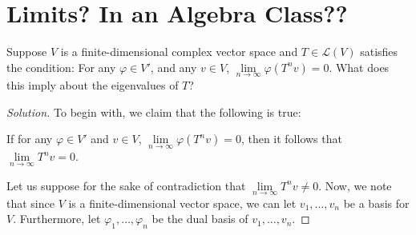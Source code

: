 \documentclass{article}
\newenvironment{solution}{\begin{proof}[Solution]}{\end{proof}}
\renewcommand\qedsymbol{$\blacksquare$}
\newenvironment{innerproof}{\renewcommand{\qedsymbol}{$\square$}\proof}{\endproof}
\begin{document}
	\section{Limits? In an Algebra Class??}
	\begin{hw}
		Suppose $V$ is a finite-dimensional complex vector space and $T \in \mathcal L(V)$ satisfies the condition: For any $\varphi \in V'$, and any $v \in V$, $\lim\limits_{n \rightarrow \infty} \varphi(T^{n}v) = 0$. What does this imply about the eigenvalues of $T$? 
	\end{hw}
	\begin{solution}
		\begin{comment}
			We observe that since, for any $\varphi \in V'$ and $v \in V$, we have $\lim\limits_{n \rightarrow \infty} \varphi(T^{n} v) = 0$, this means that even when $\varphi \neq 0$, it still maps $T^{n}v$ to $0$, for all $v \in V$.
		
		Then, it must be that for $\lim\limits_{n\rightarrow\infty} \varphi(T^{n}v) = 0$, we must have
		\begin{equation*}
			\lim\limits_{n \rightarrow\infty} T^{n}v = 0,
		\end{equation*}
		as $\varphi(0) = 0$ for all $\varphi$.
		\end{comment}
		To begin with, we claim that the following is true:
		\begin{lem}
			If for any $\varphi \in V'$ and $v \in V$, $\lim\limits_{n \rightarrow \infty} \varphi (T^{n} v) = 0$, then it follows that $\lim\limits_{n \rightarrow \infty} T^{n}v = 0$.
		\end{lem}
		\begin{innerproof}
			\begin{comment}
				Since $V$ is a finite-dimensional vector space, then let us choose some basis $v_{1}, \ldots, v_{n}$ for $V$. Furthermore, let us denote $\varphi_1, \ldots, \varphi_{n}$ be the dual basis of $v_{1}, \ldots, v_{n}$.
			
			Now, let us denote $T^{n}v$ by the following vector:
			\begin{equation*}
				T^{n}v =
				\begin{bmatrix}
					a_{1} \\ a_{2} \\ \vdots \\ a_{n}
				\end{bmatrix}
			\end{equation*}
		
			Now, we note that for any $v \in V$, we can rewrite it as a linear combination of our basis vectors: $v = a_{1}v_{1} + \ldots + a_{n}v_{n}$.
			\end{comment}
			Let us suppose for the sake of contradiction that $\lim\limits_{n \rightarrow \infty} T^{n}v \neq 0$. Now, we note that since $V$ is a finite-dimensional vector space, we can let $v_{1}, \ldots, v_{n}$ be a basis for $V$. Furthermore, let $\varphi_1, \ldots, \varphi_n$ be the dual basis of $v_{1}, \ldots, v_{n}$.
			

\end{innerproof}
\end{solution}
\end{document}
